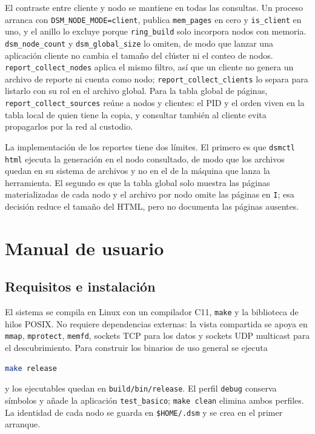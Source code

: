 \documentclass[11pt,spanish]{article}
\begin{document}
El contraste entre cliente y nodo se mantiene en todas las consultas. Un proceso arranca con \texttt{DSM\_NODE\_MODE=client}, publica \texttt{mem\_pages} en cero y \texttt{is\_client} en uno, y el anillo lo excluye porque \texttt{ring\_build} solo incorpora nodos con memoria. \texttt{dsm\_node\_count} y \texttt{dsm\_global\_size} lo omiten, de modo que lanzar una aplicación cliente no cambia el tamaño del clúster ni el conteo de nodos. \texttt{report\_collect\_nodes} aplica el mismo filtro, así que un cliente no genera un archivo de reporte ni cuenta como nodo; \texttt{report\_collect\_clients} lo separa para listarlo con su rol en el archivo global. Para la tabla global de páginas, \texttt{report\_collect\_sources} reúne a nodos y clientes: el PID y el orden viven en la tabla local de quien tiene la copia, y consultar también al cliente evita propagarlos por la red al custodio.

La implementación de los reportes tiene dos límites. El primero es que \texttt{dsmctl html} ejecuta la generación en el nodo consultado, de modo que los archivos quedan en su sistema de archivos y no en el de la máquina que lanza la herramienta. El segundo es que la tabla global solo muestra las páginas materializadas de cada nodo y el archivo por nodo omite las páginas en \texttt{I}; esa decisión reduce el tamaño del HTML, pero no documenta las páginas ausentes.

\section{Manual de usuario}\label{sec:manual}

\subsection{Requisitos e instalación}

El sistema se compila en Linux con un compilador C11, \texttt{make} y la biblioteca de hilos POSIX. No requiere dependencias externas: la vista compartida se apoya en \texttt{mmap}, \texttt{mprotect}, \texttt{memfd}, sockets TCP para los datos y sockets UDP multicast para el descubrimiento. Para construir los binarios de uso general se ejecuta
\begin{lstlisting}[language=bash]
make release
\end{lstlisting}
y los ejecutables quedan en \texttt{build/bin/release}. El perfil \texttt{debug} conserva símbolos y añade la aplicación \texttt{test\_basico}; \texttt{make clean} elimina ambos perfiles. La identidad de cada nodo se guarda en \texttt{\$HOME/.dsm} y se crea en el primer arranque.
\end{document}
